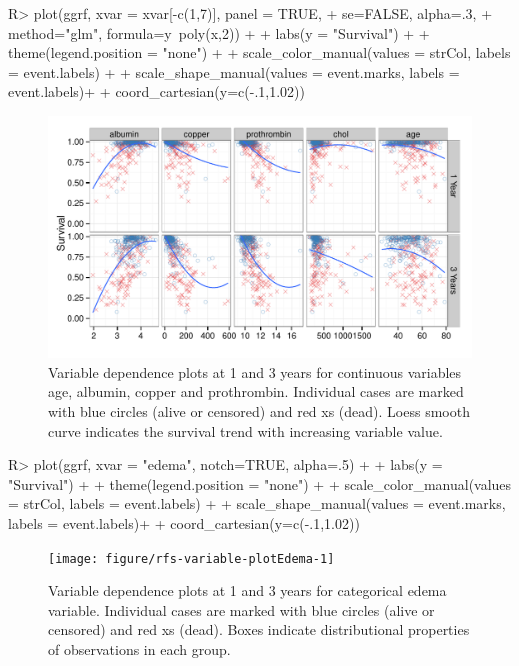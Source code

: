 \documentclass[nojss]{jss}\usepackage[]{graphicx}\usepackage[]{color}
\makeatletter
\def\maxwidth{ %
  \ifdim\Gin@nat@width>\linewidth
    \linewidth
  \else
    \Gin@nat@width
  \fi
}
\makeatother
\begin{document}
\begin{Schunk}
\begin{Sinput}
R> plot(ggrf, xvar = xvar[-c(1,7)], panel = TRUE, 
+      se=FALSE, alpha=.3, 
+      method="glm", formula=y~poly(x,2)) + 
+   labs(y = "Survival") + 
+   theme(legend.position = "none") + 
+   scale_color_manual(values = strCol, labels = event.labels) + 
+   scale_shape_manual(values = event.marks, labels = event.labels)+
+   coord_cartesian(y=c(-.1,1.02))
\end{Sinput}
\begin{figure}[!htpb]

{\centering \includegraphics[width=\maxwidth]{figure/rfs-variable-plotCombines-1} 

}

\caption[Variable dependence plots at 1 and 3 years for continuous variables age, albumin, copper and prothrombin]{Variable dependence plots at 1 and 3 years for continuous variables age, albumin, copper and prothrombin. Individual cases are marked with blue circles (alive or censored) and red xs (dead). Loess smooth curve indicates the survival trend with increasing variable value.\label{fig:variable-plotCombines}}
\end{figure}
\end{Schunk}

\begin{Schunk}
\begin{Sinput}
R> plot(ggrf, xvar = "edema", notch=TRUE, alpha=.5) + 
+   labs(y = "Survival") + 
+   theme(legend.position = "none") + 
+   scale_color_manual(values = strCol, labels = event.labels) + 
+   scale_shape_manual(values = event.marks, labels = event.labels)+
+   coord_cartesian(y=c(-.1,1.02))
\end{Sinput}
\begin{figure}[!htpb]

{\centering \texttt{[image: figure/rfs-variable-plotEdema-1]} 

}

\caption[Variable dependence plots at 1 and 3 years for categorical edema variable]{Variable dependence plots at 1 and 3 years for categorical edema variable. Individual cases are marked with blue circles (alive or censored) and red xs (dead). Boxes indicate distributional properties of observations in each group.\label{fig:variable-plotEdema}}
\end{figure}
\end{Schunk}
\end{document}
